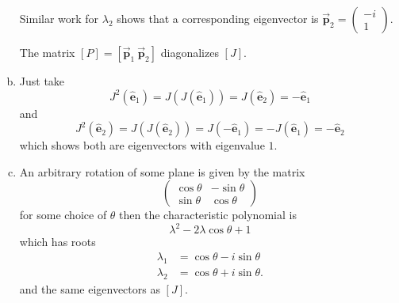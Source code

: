 \documentclass[12pt]{article} %
\newcommand{\ehat}{\boldsymbol{\hat{e}}}
\newcommand{\bvec}[1]{\boldsymbol{\vec{#1}}}
\begin{document}
\begin{solution}
\begin{enumerate}[(a)]
Similar work for $\lambda_2$ shows that a corresponding eigenvector is $\bvec{p}_2=\begin{pmatrix} -i \\ 1 \end{pmatrix}$.

\begin{remark}
The matrix $[P] = [\bvec{p}_1 ~ \bvec{p}_2]$ diagonalizes $[J]$.
\end{remark}
\item Just take
\[
J^2 (\ehat_1) = J(J(\ehat_1)) = J(\ehat_2)= -\ehat_1
\]
and
\[
J^2 (\ehat_2) = J(J(\ehat_2)) = J(-\ehat_1)= -J(\ehat_1) = -\ehat_2
\]
which shows both are eigenvectors with eigenvalue $1$.
\item An arbitrary rotation of some plane is given by the matrix
\[
\begin{pmatrix} \cos \theta & -\sin \theta \\ \sin \theta & \cos \theta \end{pmatrix}
\]
for some choice of $\theta$ then the characteristic polynomial is
\[
\lambda^2 - 2 \lambda \cos \theta + 1
\]
which has roots
\begin{align*}
\lambda_1 &= \cos \theta - i \sin \theta \\
\lambda_2 &= \cos \theta + i \sin \theta.
\end{align*}
and the same eigenvectors as $[J]$.
\end{enumerate}
\end{solution}

\newpage
\end{document}

